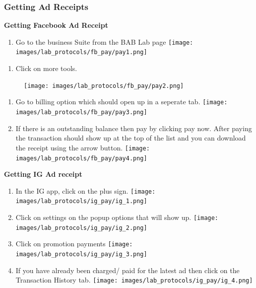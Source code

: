 \documentclass[
]{book}
\providecommand{\tightlist}{%
  \setlength{\itemsep}{0pt}\setlength{\parskip}{0pt}}
\begin{document}
\hypertarget{getting-ad-receipts}{%
\subsubsection{\texorpdfstring{\textbf{Getting Ad Receipts}}{Getting Ad Receipts}}\label{getting-ad-receipts}}

\textbf{Getting Facebook Ad Receipt}

\begin{enumerate}
\def\labelenumi{\arabic{enumi})}
\tightlist
\item
  Go to the business Suite from the BAB Lab page
  \texttt{[image: images/lab\_protocols/fb\_pay/pay1.png]}
\end{enumerate}

\begin{enumerate}
\def\labelenumi{\arabic{enumi}.}
\setcounter{enumi}{1}
\tightlist
\item
  Click on more tools.
\end{enumerate}

\begin{figure}
\centering
\texttt{[image: images/lab\_protocols/fb\_pay/pay2.png]}
\caption{}
\end{figure}

\begin{enumerate}
\def\labelenumi{\arabic{enumi}.}
\setcounter{enumi}{2}
\item
  Go to billing option which should open up in a seperate tab.
  \texttt{[image: images/lab\_protocols/fb\_pay/pay3.png]}
\item
  If there is an outstanding balance then pay by clicking pay now. After paying the transaction should show up at the top of the list and you can download the receipt using the arrow button.
  \texttt{[image: images/lab\_protocols/fb\_pay/pay4.png]}
\end{enumerate}

\textbf{Getting IG Ad receipt}

\begin{enumerate}
\def\labelenumi{\arabic{enumi}.}
\item
  In the IG app, click on the plus sign.
  \texttt{[image: images/lab\_protocols/ig\_pay/ig\_1.png]}
\item
  Click on settings on the popup options that will show up.
  \texttt{[image: images/lab\_protocols/ig\_pay/ig\_2.png]}
\item
  Click on promotion payments
  \texttt{[image: images/lab\_protocols/ig\_pay/ig\_3.png]}
\item
  If you have already been charged/ paid for the latest ad then click on the Transaction History tab.
  \texttt{[image: images/lab\_protocols/ig\_pay/ig\_4.png]}
\end{enumerate}
\end{document}
